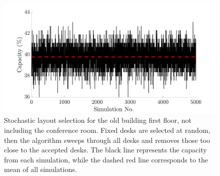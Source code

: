 \documentclass[11pt,a4paper]{article}
\begin{document}
\begin{figure}[h]
         \centering
         \includegraphics[width=1\textwidth]{random_order_sim.png}
         \caption{Stochastic layout selection for the old building first floor, not including the conference room. Fixed desks are selected at random, then the algorithm sweeps through all desks and removes those too close to the accepted desks. The black line represents the capacity from each simulation, while the dashed red line corresponds to the mean of all simulations.}
         \label{fig:Stochastic_sims}
\end{figure}
\end{document}
